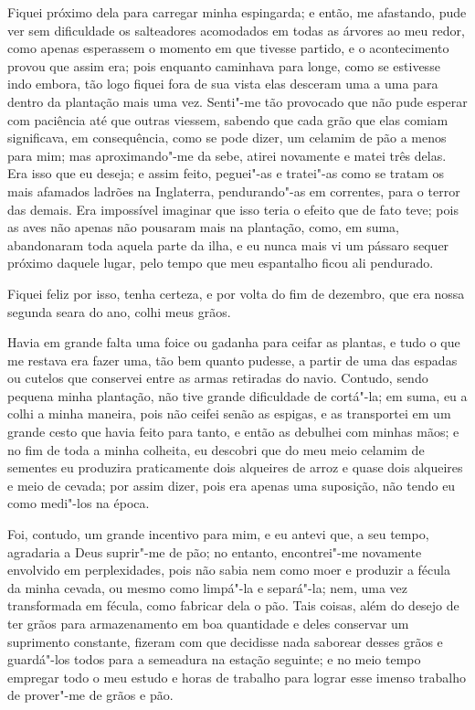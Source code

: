 Fiquei próximo dela para carregar minha espingarda; e então, me
afastando, pude ver sem dificuldade os salteadores acomodados em todas
as árvores ao meu redor, como apenas esperassem o momento em que tivesse
partido, e o acontecimento provou que assim era; pois enquanto caminhava
para longe, como se estivesse indo embora, tão logo fiquei fora de sua
vista elas desceram uma a uma para dentro da plantação mais uma vez.
Senti"-me tão provocado que não pude esperar com paciência até que outras
viessem, sabendo que cada grão que elas comiam significava, em
consequência, como se pode dizer, um celamim de pão a menos para mim;
mas aproximando"-me da sebe, atirei novamente e matei três delas. Era
isso que eu deseja; e assim feito, peguei"-as e tratei"-as como se tratam
os mais afamados ladrões na Inglaterra, pendurando"-as em correntes, para
o terror das demais. Era impossível imaginar que isso teria o efeito que
de fato teve; pois as aves não apenas não pousaram mais na plantação,
como, em suma, abandonaram toda aquela parte da ilha, e eu nunca mais vi
um pássaro sequer próximo daquele lugar, pelo tempo que meu espantalho
ficou ali pendurado.

Fiquei feliz por isso, tenha certeza, e por volta do fim de dezembro,
que era nossa segunda seara do ano, colhi meus grãos.

Havia em grande falta uma foice ou gadanha para ceifar as plantas, e
tudo o que me restava era fazer uma, tão bem quanto pudesse, a partir de
uma das espadas ou cutelos que conservei entre as armas retiradas do
navio. Contudo, sendo pequena minha plantação, não tive grande
dificuldade de cortá"-la; em suma, eu a colhi a minha maneira, pois não
ceifei senão as espigas, e as transportei em um grande cesto que havia
feito para tanto, e então as debulhei com minhas mãos; e no fim de toda
a minha colheita, eu descobri que do meu meio celamim de sementes eu
produzira praticamente dois alqueires de arroz e quase dois alqueires e
meio de cevada; por assim dizer, pois era apenas uma suposição, não
tendo eu como medi"-los na época.

Foi, contudo, um grande incentivo para mim, e eu antevi que, a seu
tempo, agradaria a Deus suprir"-me de pão; no entanto, encontrei"-me
novamente envolvido em perplexidades, pois não sabia nem como moer e
produzir a fécula da minha cevada, ou mesmo como limpá"-la e separá"-la;
nem, uma vez transformada em fécula, como fabricar dela o pão. Tais
coisas, além do desejo de ter grãos para armazenamento em boa quantidade
e deles conservar um suprimento constante, fizeram com que decidisse
nada saborear desses grãos e guardá"-los todos para a semeadura na
estação seguinte; e no meio tempo empregar todo o meu estudo e horas de
trabalho para lograr esse imenso trabalho de prover"-me de grãos e pão.

